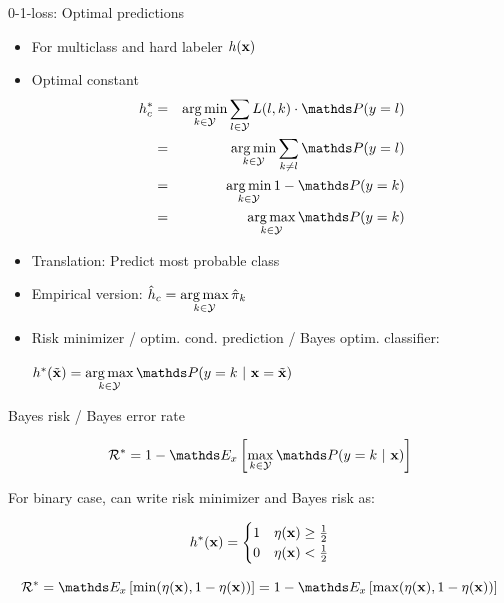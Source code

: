 \documentclass[11pt,compress,t,notes=noshow, xcolor=table]{beamer}
\begin{document}
\begin{vbframe}{0-1-loss: Optimal predictions}

\begin{itemize}

\item For multiclass and hard labeler $h(\mathbf{x})$
\item Optimal constant
\begin{eqnarray*}   h_{c}^{\ast}  &=& \argmin_{k \in \Yspace} \sum_{l \in \Yspace} L(l, k) \cdot \P(y = l) \\
&=& \argmin_{k \in \Yspace} \sum_{k \ne l} \P(y = l) \\ 
  &=& \argmin_{k \in \Yspace} 1 - \P(y = k) \\
  &=& \argmax_{k \in \Yspace} \P(y = k)
  \end{eqnarray*}


\item Translation: Predict most probable class

\item Empirical version: $\hat{h}_c = \mathop{\mathrm{arg\,max}}\limits_{k \in \mathcal{Y}} \hat{\pi}_{k}$

\item Risk minimizer / optim. cond. prediction / Bayes optim. classifier:

 $h^{\ast}(\xtil) = \argmaxlim_{k \in \Yspace} \P(y = k~|~ \xv = \xtil)$ 

\end{itemize}

\end{vbframe}


\begin{vbframe}{Bayes risk  / Bayes error rate}

$$
  \riskbayes = 1 - \E_{x} \left[\max_{k \in \Yspace} \P(y = k~|~ \xv)\right]
$$

\vfill

For binary case, can write risk minimizer and Bayes risk as:  

$$
  h^{\ast}(\mathbf{x}) = \begin{cases} 1 & \eta(\mathbf{x}) \ge \frac{1}{2} \\ 0 & \eta(\mathbf{x}) < \frac{1}{2}\end{cases} 
$$

$$
\riskbayes = \E_x\left[\min(\eta(\xv), 1 - \eta(\xv))\right] = 1 - \E_x\left[\max(\eta(\xv), 1 - \eta(\xv))\right] 
$$

 
\end{vbframe}
\end{document}
